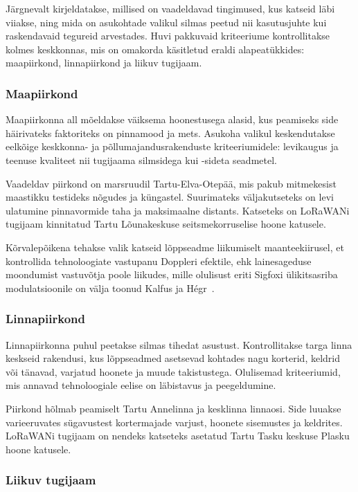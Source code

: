 \documentclass[12pt]{article}
\begin{document}
    Järgnevalt kirjeldatakse, millised on vaadeldavad tingimused, kus katseid läbi viiakse, ning mida on asukohtade valikul silmas peetud nii kasutusjuhte kui raskendavaid tegureid arvestades.
    Huvi pakkuvaid kriteeriume kontrollitakse kolmes keskkonnas, mis on omakorda käsitletud eraldi alapeatükkides: maapiirkond, linnapiirkond ja liikuv tugijaam.

    \subsubsection{Maapiirkond}

    Maapiirkonna all mõeldakse väiksema hoonestusega alasid, kus peamiseks side häirivateks faktoriteks on pinnamood ja mets.
    Asukoha valikul keskendutakse eelkõige keskkonna- ja põllumajandusrakenduste kriteeriumidele: levikaugus ja teenuse kvaliteet nii tugijaama silmsidega kui -sideta seadmetel.

    Vaadeldav piirkond on marsruudil Tartu-Elva-Otepää, mis pakub mitmekesist maastikku testideks nõgudes ja küngastel.
    Suurimateks väljakutseteks on levi ulatumine pinnavormide taha ja maksimaalne distants.
    Katseteks on LoRaWANi tugijaam kinnitatud Tartu Lõunakeskuse seitsmekorruselise hoone katusele.

    Kõrvalepõikena tehakse valik katseid lõppseadme liikumiselt maanteekiirusel, et kontrollida tehnoloogiate vastupanu Doppleri efektile, ehk lainesageduse moondumist vastuvõtja poole liikudes, mille olulisust eriti Sigfoxi ülikitsasriba modulatsioonile on välja toonud Kalfus ja Hégr~\cite{kalfus2016ultra}.

    \subsubsection{Linnapiirkond}

    Linnapiirkonna puhul peetakse silmas tihedat asustust.
    Kontrollitakse targa linna keskseid rakendusi, kus lõppseadmed asetsevad kohtades nagu korterid, keldrid või tänavad, varjatud hoonete ja muude takistustega.
    Olulisemad kriteeriumid, mis annavad tehnoloogiale eelise on läbistavus ja peegeldumine.

    Piirkond hõlmab peamiselt Tartu Annelinna ja kesklinna linnaosi.
    Side luuakse varieeruvates sügavustest kortermajade varjust, hoonete sisemustes ja keldrites.
    LoRaWANi tugijaam on nendeks katseteks asetatud Tartu Tasku keskuse Plasku hoone katusele.

    \subsubsection{Liikuv tugijaam}
\end{document}
